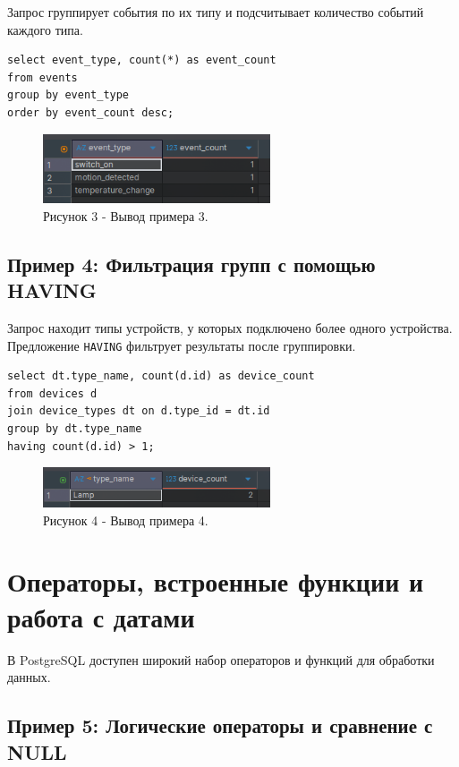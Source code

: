 \documentclass[oneside,a4paper,14pt]{extarticle}
\begin{document}
Запрос группирует события по их типу и подсчитывает количество событий каждого типа.

\begin{verbatim}
select event_type, count(*) as event_count
from events
group by event_type
order by event_count desc;
\end{verbatim}

\begin{figure}[H]
  \centering
  \includegraphics[width=0.6\textwidth]{pics/event_group.png}
  \caption*{Рисунок 3 - Вывод примера 3.}
\end{figure}

\subsection*{Пример 4: Фильтрация групп с помощью HAVING}

Запрос находит типы устройств, у которых подключено более одного устройства. Предложение \texttt{HAVING} фильтрует результаты после группировки.

\begin{verbatim}
select dt.type_name, count(d.id) as device_count
from devices d
join device_types dt on d.type_id = dt.id
group by dt.type_name
having count(d.id) > 1;
\end{verbatim}

\begin{figure}[H]
  \centering
  \includegraphics[width=0.6\textwidth]{pics/group_filter.png}
  \caption*{Рисунок 4 - Вывод примера 4.}
\end{figure}

\section*{Операторы, встроенные функции и работа с датами}

В PostgreSQL доступен широкий набор операторов и функций для обработки данных.

\subsection*{Пример 5: Логические операторы и сравнение с NULL}
\end{document}
